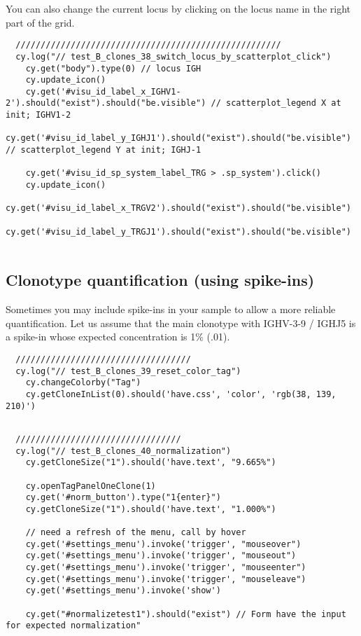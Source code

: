 You can also change the current locus by clicking on the locus name in the
right part of the grid.
\begin{verbatim}
  /////////////////////////////////////////////////////
  cy.log("// test_B_clones_38_switch_locus_by_scatterplot_click")
    cy.get("body").type(0) // locus IGH
    cy.update_icon()
    cy.get('#visu_id_label_x_IGHV1-2').should("exist").should("be.visible") // scatterplot_legend X at init; IGHV1-2
    cy.get('#visu_id_label_y_IGHJ1').should("exist").should("be.visible")   // scatterplot_legend Y at init; IGHJ-1

    cy.get('#visu_id_sp_system_label_TRG > .sp_system').click()
    cy.update_icon()
    cy.get('#visu_id_label_x_TRGV2').should("exist").should("be.visible")
    cy.get('#visu_id_label_y_TRGJ1').should("exist").should("be.visible")


\end{verbatim}

\subsection{Clonotype quantification (using spike-ins)}

Sometimes you may include spike-ins in your sample to allow a more reliable
quantification.
Let us assume that the main clonotype with IGHV-3-9 / IGHJ5 is a spike-in whose
expected concentration is 1\% (.01).

\begin{verbatim}
  ///////////////////////////////////
  cy.log("// test_B_clones_39_reset_color_tag")
    cy.changeColorby("Tag")
    cy.getCloneInList(0).should('have.css', 'color', 'rgb(38, 139, 210)')


\end{verbatim}

\begin{verbatim}
  /////////////////////////////////
  cy.log("// test_B_clones_40_normalization")
    cy.getCloneSize("1").should('have.text', "9.665%")

    cy.openTagPanelOneClone(1)
    cy.get('#norm_button').type("1{enter}")
    cy.getCloneSize("1").should('have.text', "1.000%")

    // need a refresh of the menu, call by hover
    cy.get('#settings_menu').invoke('trigger', "mouseover")
    cy.get('#settings_menu').invoke('trigger', "mouseout")
    cy.get('#settings_menu').invoke('trigger', "mouseenter")
    cy.get('#settings_menu').invoke('trigger', "mouseleave")
    cy.get('#settings_menu').invoke('show')

    cy.get("#normalizetest1").should("exist") // Form have the input for expected normalization"


\end{verbatim}

